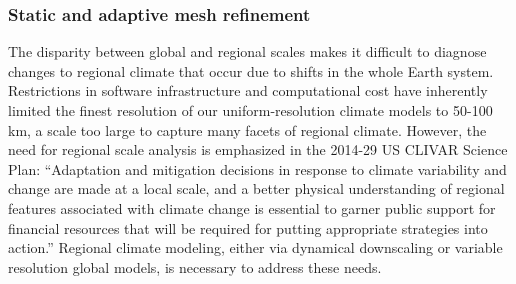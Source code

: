 \documentclass[11pt]{article}
\begin{document}

\subsubsection{Static and adaptive mesh refinement} \label{sec:Refinement}

The disparity between global and regional scales makes it difficult to diagnose changes to regional climate that occur due to shifts in the whole Earth system.  Restrictions in software infrastructure and computational cost have inherently limited the finest resolution of our uniform-resolution climate models to 50-100 km, a scale too large to capture many facets of regional climate.  However, the need for regional scale analysis is emphasized in the 2014-29 US CLIVAR Science Plan: ``Adaptation and mitigation decisions in response to climate variability and change are made at a local scale, and a better physical understanding of regional features associated with climate change is essential to garner public support for financial resources that will be required for putting appropriate strategies into action.''  Regional climate modeling, either via dynamical downscaling or variable resolution global models, is necessary to address these needs.
\end{document}
